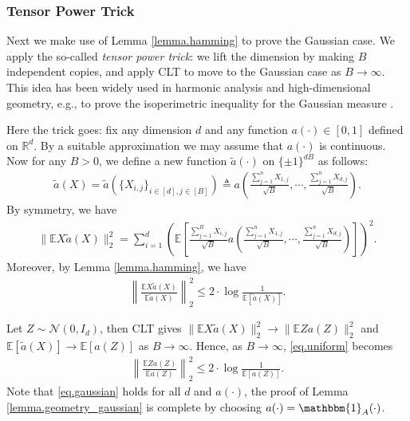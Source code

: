 \documentclass[final,12pt]{colt2018} %
\def \bE {\mathbb{E}}
\def \bR {\mathbb{R}}
\newcommand{\calN}{{\mathcal{N}}}
\begin{document}
\subsubsection{Tensor Power Trick}
Next we make use of Lemma \ref{lemma.hamming} to prove the Gaussian case. We apply the so-called \emph{tensor power trick}: we lift the dimension by making $B$ independent copies, and apply CLT to move to the Gaussian case as $B\to\infty$. This idea has been widely used in harmonic analysis and high-dimensional geometry, e.g., to prove the isoperimetric inequality for the Gaussian measure \cite{ledoux2005concentration}. 

Here the trick goes: fix any dimension $d$ and any function $a(\cdot)\in [0,1]$ defined on $\bR^d$. By a suitable approximation we may assume that $a(\cdot)$ is continuous. Now for any $B>0$, we define a new function $\tilde{a}(\cdot)$ on $\{\pm 1\}^{dB}$ as follows:
\begin{align*}
\tilde{a}(X)=\tilde{a}(\{X_{i,j}\}_{i\in [d],j\in [B]}) \triangleq a\left(\frac{\sum_{j=1}^n X_{1,j}}{\sqrt{B}},\cdots,\frac{\sum_{j=1}^n X_{d,j}}{\sqrt{B}}\right).
\end{align*}
By symmetry, we have
\begin{align*}
\|\bE X\tilde{a}(X)\|_2^2 = \sum_{i=1}^d \left(\bE\left[\frac{\sum_{j=1}^B X_{i,j}}{\sqrt{B}}a\left(\frac{\sum_{j=1}^n X_{1,j}}{\sqrt{B}},\cdots,\frac{\sum_{j=1}^n X_{d,j}}{\sqrt{B}}\right)\right]\right)^2.
\end{align*}
Moreover, by Lemma \ref{lemma.hamming}, we have
\begin{align}\label{eq.uniform}
\left\|\frac{\bE X\tilde{a}(X)}{\bE \tilde{a}(X)}\right\|_2^2 \le 2\cdot \log \frac{1}{\bE[\tilde{a}(X)]}.
\end{align}

Let $Z\sim \calN(0,I_d)$, then CLT gives $\|\bE X\tilde{a}(X)\|_2^2 \to \|\bE Za(Z)\|_2^2$ and $\bE[\tilde{a}(X)]\to \bE[a(Z)]$ as $B\to\infty$. Hence, as $B\to\infty$, \eqref{eq.uniform} becomes
\begin{align}\label{eq.gaussian}
\left\|\frac{\bE Za(Z)}{\bE {a}(Z)}\right\|_2^2 \le 2\cdot \log \frac{1}{\bE[a(Z)]}.
\end{align}
Note that \eqref{eq.gaussian} holds for all $d$ and $a(\cdot)$, the proof of Lemma \ref{lemma.geometry_gaussian} is complete by choosing $a(\cdot)=\mathbbm{1}_A(\cdot)$. 
\end{document}
